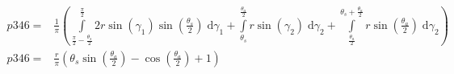 \begin{align}
    p346 =&\frac{1}{\pi} \left(\int\limits_{\frac{\pi}{2} - \frac{\theta_{s}}{2}}^{\frac{\pi}{2}}2 r \sin{\left (\gamma_{1} \right )} \sin{\left (\frac{\theta_{s}}{2} \right )}\;\mathrm{d}\gamma_{1}+\int\limits_{\theta_{s}}^{\frac{\theta_{a}}{2}}r \sin{\left (\gamma_{2} \right )}\;\mathrm{d}\gamma_{2}+\int\limits_{\frac{\theta_{a}}{2}}^{\theta_{s} + \frac{\theta_{a}}{2}}r \sin{\left (\frac{\theta_{a}}{2} \right )}\;\mathrm{d}\gamma_{2}\right)\\
    p346 =& \frac{r}{\pi} \left(\theta_{s} \sin{\left (\frac{\theta_{a}}{2} \right )} - \cos{\left (\frac{\theta_{a}}{2} \right )} + 1\right)
\end{align}